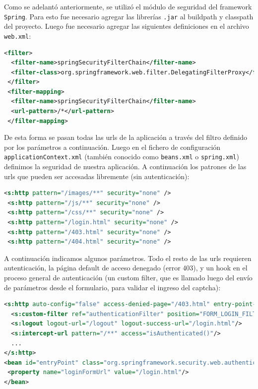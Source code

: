 \documentclass[letter]{article}
\begin{document}
Como se adelantó anteriormente, se utilizó el módulo de seguridad del framework \texttt{Spring}. Para esto fue necesario agregar las librerías \texttt{.jar} al buildpath y classpath del proyecto. Luego fue necesario agregar las siguientes definiciones en el archivo \texttt{web.xml}:

\begin{lstlisting}[language=xml]
 <filter>
  <filter-name>springSecurityFilterChain</filter-name>
  <filter-class>org.springframework.web.filter.DelegatingFilterProxy</filter-class>
 </filter>
 <filter-mapping>
  <filter-name>springSecurityFilterChain</filter-name>
  <url-pattern>/*</url-pattern>
 </filter-mapping>
\end{lstlisting}

De esta forma se pasan todas las urls de la aplicación a través del filtro definido por los parámetros a continuación. Luego en el fichero de configuración \texttt{applicationContext.xml} (también conocido como \texttt{beans.xml} o \texttt{spring.xml}) definimos la seguridad de nuestra aplicación. A continuación los patrones de las urls que pueden ser accesadas libremente (sin autenticación):

\begin{lstlisting}[language=xml]
 <s:http pattern="/images/**" security="none" />
 <s:http pattern="/js/**" security="none" />
 <s:http pattern="/css/**" security="none" />
 <s:http pattern="/login.html" security="none" />
 <s:http pattern="/403.html" security="none" />
 <s:http pattern="/404.html" security="none" />
\end{lstlisting}
A continuación indicamos algunos parámetros. Todo el resto de las urls requieren autenticación, la página default de acceso denegado (error 403), y un hook en el proceso general de autenticación (un custom filter, que es llamado luego del envío de parámetros desde el formulario, para validar el ingreso del captcha):
\begin{lstlisting}[language=xml]
<s:http auto-config="false" access-denied-page="/403.html" entry-point-ref="entryPoint" >
  <s:custom-filter ref="authenticationFilter" position="FORM_LOGIN_FILTER"/>
  <s:logout logout-url="/logout" logout-success-url="/login.html"/>
  <s:intercept-url pattern="/**" access="isAuthenticated()"/>
  ...
</s:http>
<bean id="entryPoint" class="org.springframework.security.web.authentication.LoginUrlAuthenticationEntryPoint">
 <property name="loginFormUrl" value="/login.html"/>
</bean>
\end{lstlisting}
\end{document}
